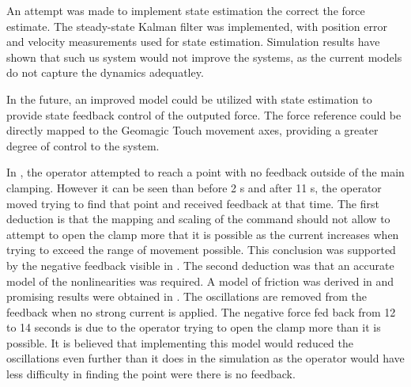 An attempt was made to implement state estimation the correct the force estimate.
The steady-state Kalman filter was implemented, with position error and velocity measurements used for state estimation.
Simulation results have shown that such us system would not improve the systems, as the current models do not capture the dynamics adequatley.

In the future, an improved model could be utilized with state estimation to provide state feedback control of the outputed force.
The force reference could be directly mapped to the Geomagic Touch movement axes, providing a greater degree of control to the system.

In , the operator attempted to reach a point with no feedback outside of the main clamping. However it can be seen than before 2 s and after 11 s, the operator moved trying to find that point and received feedback at that time. The first deduction is that the mapping and scaling of the command should not allow to attempt to open the clamp more that it is possible as the current increases when trying to exceed the range of movement possible. This conclusion was supported by the negative feedback visible in . The second deduction was that an accurate model of the nonlinearities was required. 
A model of friction was derived in  and promising results were obtained in . The oscillations are removed from the feedback when no strong current is applied. The negative force fed back from 12 to 14 seconds is due to the operator trying to open the clamp more than it is possible. It is believed that implementing this model would reduced the oscillations even further than it does in the simulation as the operator would have less difficulty in finding the point were there is no feedback.

